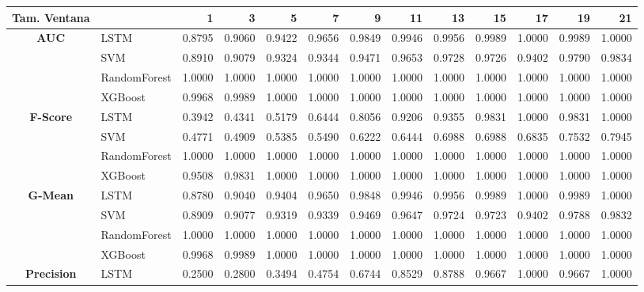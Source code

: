 \begin{table}[h]
\centering
\begin{adjustbox}{max width=15cm}
	\begin{tabular}{|c|l|r|r|r|r|r|r|r|r|r|r|r|}
		\hline
		\textbf{Tam. Ventana} &         &      1  &      3  &      5  &      7  &      9  &      11 &      13 &      15 &      17 &      19 &      21 \\
		\hline
		\textbf{AUC} & LSTM &  0.8795 &  0.9060 &  0.9422 &  0.9656 &  0.9849 &  0.9946 &  0.9956 &  0.9989 &  1.0000 &  0.9989 &  1.0000 \\
		& SVM &  0.8910 &  0.9079 &  0.9324 &  0.9344 &  0.9471 &  0.9653 &  0.9728 &  0.9726 &  0.9402 &  0.9790 &  0.9834 \\
		& RandomForest &  1.0000 &  1.0000 &  1.0000 &  1.0000 &  1.0000 &  1.0000 &  1.0000 &  1.0000 &  1.0000 &  1.0000 &  1.0000 \\
		& XGBoost &  0.9968 &  0.9989 &  1.0000 &  1.0000 &  1.0000 &  1.0000 &  1.0000 &  1.0000 &  1.0000 &  1.0000 &  1.0000 \\
		\hline
		\textbf{F-Score} & LSTM &  0.3942 &  0.4341 &  0.5179 &  0.6444 &  0.8056 &  0.9206 &  0.9355 &  0.9831 &  1.0000 &  0.9831 &  1.0000 \\
		& SVM &  0.4771 &  0.4909 &  0.5385 &  0.5490 &  0.6222 &  0.6444 &  0.6988 &  0.6988 &  0.6835 &  0.7532 &  0.7945 \\
		& RandomForest &  1.0000 &  1.0000 &  1.0000 &  1.0000 &  1.0000 &  1.0000 &  1.0000 &  1.0000 &  1.0000 &  1.0000 &  1.0000 \\
		& XGBoost &  0.9508 &  0.9831 &  1.0000 &  1.0000 &  1.0000 &  1.0000 &  1.0000 &  1.0000 &  1.0000 &  1.0000 &  1.0000 \\
		\hline
		\textbf{G-Mean} & LSTM &  0.8780 &  0.9040 &  0.9404 &  0.9650 &  0.9848 &  0.9946 &  0.9956 &  0.9989 &  1.0000 &  0.9989 &  1.0000 \\
		& SVM &  0.8909 &  0.9077 &  0.9319 &  0.9339 &  0.9469 &  0.9647 &  0.9724 &  0.9723 &  0.9402 &  0.9788 &  0.9832 \\
		& RandomForest &  1.0000 &  1.0000 &  1.0000 &  1.0000 &  1.0000 &  1.0000 &  1.0000 &  1.0000 &  1.0000 &  1.0000 &  1.0000 \\
		& XGBoost &  0.9968 &  0.9989 &  1.0000 &  1.0000 &  1.0000 &  1.0000 &  1.0000 &  1.0000 &  1.0000 &  1.0000 &  1.0000 \\
		\hline
		\textbf{Precision} & LSTM &  0.2500 &  0.2800 &  0.3494 &  0.4754 &  0.6744 &  0.8529 &  0.8788 &  0.9667 &  1.0000 &  0.9667 &  1.0000 \\

\end{tabular}
\end{adjustbox}
\end{table}
